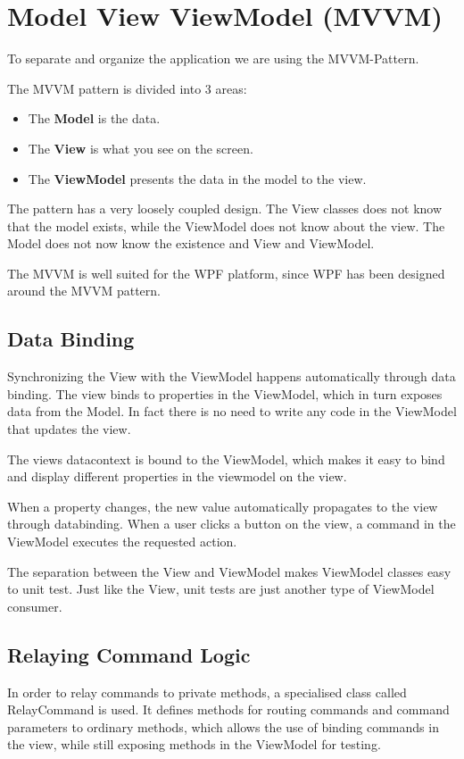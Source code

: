 \chapter{Model View ViewModel (MVVM)}\label{MVVMSection}
To separate and organize the application we are using the MVVM-Pattern.

The MVVM pattern is divided into 3 areas:

\begin{itemize}
	\item The \textbf{Model} is the data.
	\item The \textbf{View} is what you see on the screen.
	\item The \textbf{ViewModel} presents the data in the model to the view.
\end{itemize}

The pattern has a very loosely coupled design.
The View classes does not know that the model exists, while the ViewModel does not know about the view. The Model does not now know the existence and View and ViewModel.

The MVVM is well suited for the WPF platform, since WPF has been designed around the MVVM pattern.

\section{Data Binding}
Synchronizing the View with the ViewModel happens automatically through data binding.
The view binds to properties in the ViewModel, which in turn exposes data from the Model. In fact there is no need to write any code in the ViewModel that updates the view.

The views datacontext is bound to the ViewModel, which makes it easy to bind and display different properties in the viewmodel on the view.

When a property changes, the new value automatically propagates to the view through databinding.
When a user clicks a button on the view, a command in the ViewModel executes the requested action.

The separation between the View and ViewModel makes ViewModel classes easy to unit test. Just like the View, unit tests are just another type of ViewModel consumer.\cite{mvvm}

\section{Relaying Command Logic}
In order to relay commands to private methods, a specialised class called RelayCommand is used. It defines methods for routing commands and command parameters to ordinary methods, which allows the use of binding commands in the view, while still exposing methods in the ViewModel for testing.

